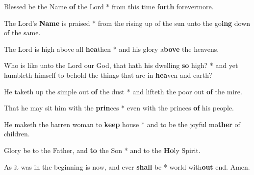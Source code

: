 \begin{multicols}{2}
	Blessed be the Name \textbf{of} the Lord * from this time \textbf{forth} forevermore.
	
	The Lord's \textbf{Name} is praised * from the rising up of the sun unto the go\textbf{ing} down of the same.
	
	The Lord is high above all \textbf{hea}then * and his glory a\textbf{bove} the heavens.
	
	Who is like unto the Lord our God, that hath his dwelling \textbf{so} high? * and yet humbleth himself to behold the things that are in \textbf{hea}ven and earth?
	
	He taketh up the simple out \textbf{of} the dust * and lifteth the poor out \textbf{of} the mire.
	
	That he may sit him with the \textbf{prin}ces * even with the princes \textbf{of} his people.
	
	He maketh the barren woman to \textbf{keep} house * and to be the joyful mo\textbf{ther} of children.
	
	Glory be to the Father, and \textbf{to} the Son * and to the \textbf{Ho}ly Spirit.
	
	As it was in the beginning is now, and ever \textbf{shall} be * world with\textbf{out} end. Amen.
\end{multicols}